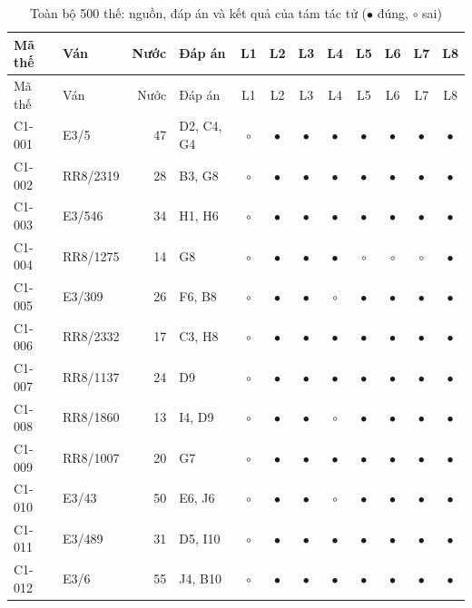 \par{\scriptsize
\renewcommand{\arraystretch}{0.95}
\begin{longtable}{llrp{3.9cm}cccccccc}
  \caption{Toàn bộ 500 thế: nguồn, đáp án và kết quả của tám tác tử ($\bullet$ đúng, $\circ$ sai)}\label{tab:cs-ct-tatca}\\
    \toprule
    Mã thế & Ván & Nước & Đáp án & L1 & L2 & L3 & L4 & L5 & L6 & L7 & L8 \\
    \midrule
  \endfirsthead
    \toprule
    Mã thế & Ván & Nước & Đáp án & L1 & L2 & L3 & L4 & L5 & L6 & L7 & L8 \\
    \midrule
  \endhead
    \bottomrule
  \endfoot
    C1-001 & E3/5 & 47 & D2, C4, G4 & $\circ$ & $\bullet$ & $\bullet$ & $\bullet$ & $\bullet$ & $\bullet$ & $\bullet$ & $\bullet$ \\
    C1-002 & RR8/2319 & 28 & B3, G8 & $\circ$ & $\bullet$ & $\bullet$ & $\bullet$ & $\bullet$ & $\bullet$ & $\bullet$ & $\bullet$ \\
    C1-003 & E3/546 & 34 & H1, H6 & $\circ$ & $\bullet$ & $\bullet$ & $\bullet$ & $\bullet$ & $\bullet$ & $\bullet$ & $\bullet$ \\
    C1-004 & RR8/1275 & 14 & G8 & $\circ$ & $\bullet$ & $\bullet$ & $\bullet$ & $\circ$ & $\circ$ & $\circ$ & $\bullet$ \\
    C1-005 & E3/309 & 26 & F6, B8 & $\circ$ & $\bullet$ & $\bullet$ & $\circ$ & $\bullet$ & $\bullet$ & $\bullet$ & $\bullet$ \\
    C1-006 & RR8/2332 & 17 & C3, H8 & $\circ$ & $\bullet$ & $\bullet$ & $\bullet$ & $\bullet$ & $\bullet$ & $\bullet$ & $\bullet$ \\
    C1-007 & RR8/1137 & 24 & D9 & $\circ$ & $\bullet$ & $\bullet$ & $\bullet$ & $\bullet$ & $\bullet$ & $\bullet$ & $\bullet$ \\
    C1-008 & RR8/1860 & 13 & I4, D9 & $\circ$ & $\bullet$ & $\bullet$ & $\circ$ & $\bullet$ & $\bullet$ & $\bullet$ & $\bullet$ \\
    C1-009 & RR8/1007 & 20 & G7 & $\circ$ & $\bullet$ & $\bullet$ & $\bullet$ & $\bullet$ & $\bullet$ & $\bullet$ & $\bullet$ \\
    C1-010 & E3/43 & 50 & E6, J6 & $\circ$ & $\bullet$ & $\bullet$ & $\circ$ & $\bullet$ & $\bullet$ & $\bullet$ & $\bullet$ \\
    C1-011 & E3/489 & 31 & D5, I10 & $\circ$ & $\bullet$ & $\bullet$ & $\bullet$ & $\bullet$ & $\bullet$ & $\bullet$ & $\bullet$ \\
    C1-012 & E3/6 & 55 & J4, B10 & $\circ$ & $\bullet$ & $\bullet$ & $\bullet$ & $\bullet$ & $\bullet$ & $\bullet$ & $\bullet$ \\

\end{longtable}}
